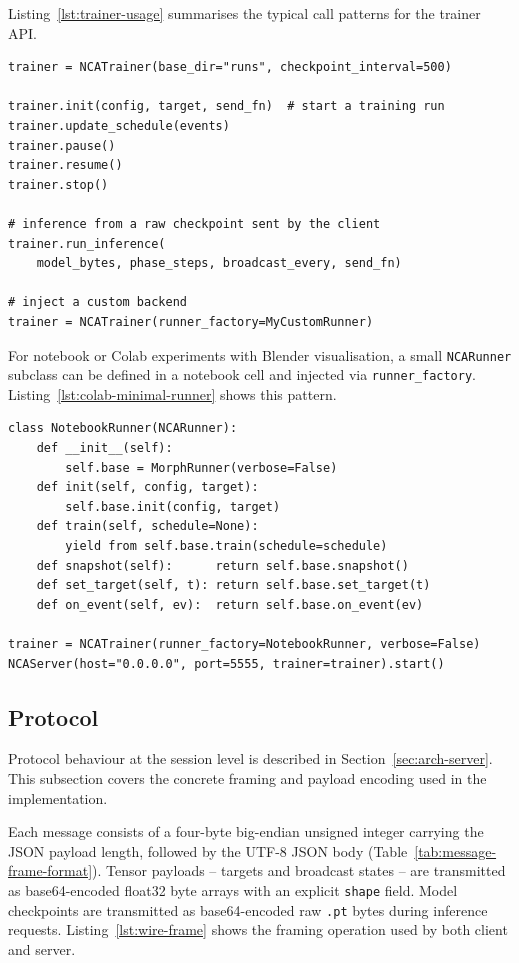 Listing~\ref{lst:trainer-usage} summarises the typical call patterns for the
trainer API.

\begin{lstlisting}[style=py, caption={Typical trainer usage patterns from the
server layer (pseudocode).}, label={lst:trainer-usage}]
trainer = NCATrainer(base_dir="runs", checkpoint_interval=500)

trainer.init(config, target, send_fn)  # start a training run
trainer.update_schedule(events)
trainer.pause()
trainer.resume()
trainer.stop()

# inference from a raw checkpoint sent by the client
trainer.run_inference(
    model_bytes, phase_steps, broadcast_every, send_fn)

# inject a custom backend
trainer = NCATrainer(runner_factory=MyCustomRunner)
\end{lstlisting}

For notebook or Colab experiments with Blender visualisation, a small
\texttt{NCARunner} subclass can be defined in a notebook cell and injected via
\texttt{runner\_factory}. Listing~\ref{lst:colab-minimal-runner} shows this
pattern.

\begin{lstlisting}[style=py, caption={Custom runner injection for notebook
experiments (simplified).}, label={lst:colab-minimal-runner}]
class NotebookRunner(NCARunner):
    def __init__(self):
        self.base = MorphRunner(verbose=False)
    def init(self, config, target):
        self.base.init(config, target)
    def train(self, schedule=None):
        yield from self.base.train(schedule=schedule)
    def snapshot(self):      return self.base.snapshot()
    def set_target(self, t): return self.base.set_target(t)
    def on_event(self, ev):  return self.base.on_event(ev)

trainer = NCATrainer(runner_factory=NotebookRunner, verbose=False)
NCAServer(host="0.0.0.0", port=5555, trainer=trainer).start()
\end{lstlisting}

\subsection{Protocol}

Protocol behaviour at the session level is described in
Section~\ref{sec:arch-server}. This subsection covers the concrete framing
and payload encoding used in the implementation.

Each message consists of a four-byte big-endian unsigned integer carrying the
JSON payload length, followed by the UTF-8 JSON body
(Table~\ref{tab:message-frame-format}). Tensor payloads -- targets and
broadcast states -- are transmitted as base64-encoded float32 byte arrays
with an explicit \texttt{shape} field. Model checkpoints are transmitted as
base64-encoded raw \texttt{.pt} bytes during inference requests.
Listing~\ref{lst:wire-frame} shows the framing operation used by both client
and server.


